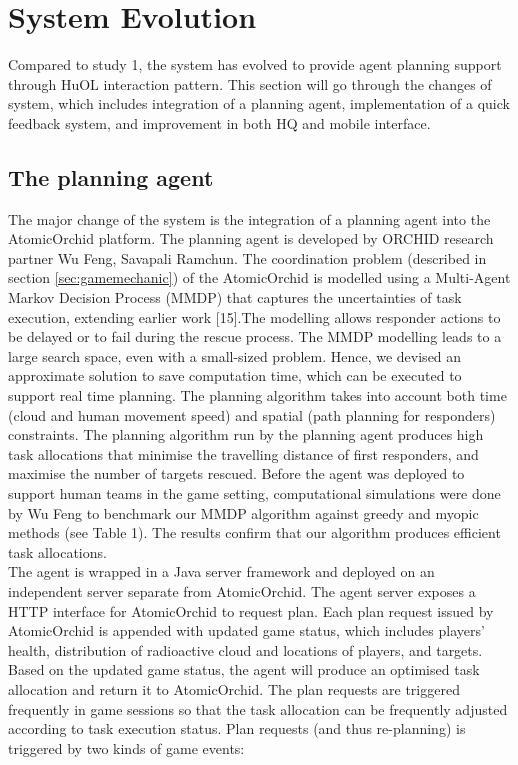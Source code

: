 \section{System Evolution}
Compared to study 1, the system has evolved to provide agent planning support through HuOL interaction pattern. This section will go through the changes of system, which includes integration of a planning agent, implementation of a quick feedback system, and improvement in both HQ and mobile interface.

\subsection{The planning agent}
The major change of the system is the integration of a planning agent into the AtomicOrchid platform. The planning agent is developed by ORCHID research partner Wu Feng, Savapali Ramchun. The coordination problem (described in section \ref{sec:gamemechanic}) of the AtomicOrchid is modelled using a Multi-Agent Markov Decision Process (MMDP) that captures the uncertainties of task execution, extending earlier work [15].The modelling allows responder actions to be delayed or to fail during the rescue process. The MMDP modelling leads to a large search space, even with a small-sized problem. Hence, we devised an approximate solution to save computation time, which can be executed to support real time planning. The planning algorithm takes into account both time (cloud and human movement speed) and spatial (path planning for responders) constraints. The planning algorithm run by the planning agent produces high task allocations that minimise the travelling distance of first responders, and maximise the number of targets rescued. Before the agent was deployed to support human teams in the game setting, computational simulations were done by Wu Feng to benchmark our MMDP algorithm against greedy and myopic methods (see Table 1). The results confirm that our algorithm produces efficient task allocations.\\

The agent is wrapped in a Java server framework and deployed on an independent server separate from AtomicOrchid. The agent server exposes a HTTP interface for AtomicOrchid to request plan. Each plan request issued by AtomicOrchid is appended with  updated game status, which includes players' health, distribution of radioactive cloud and locations of players, and targets. Based on the updated game status, the agent will produce an optimised task allocation and return it to AtomicOrchid. The plan requests are triggered frequently in game sessions so that the task allocation can be frequently adjusted according to task execution status. Plan requests (and thus re-planning) is triggered by two kinds of game events:\\


